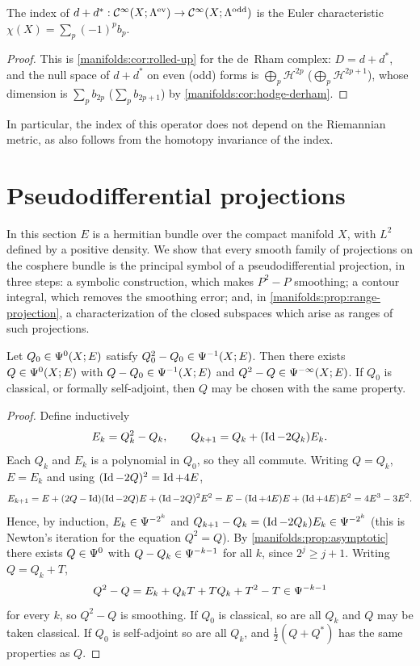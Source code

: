 \begin{corollary}\label{manifolds:cor:euler}
The index of $d+d^*:\mathcal{C}^\infty(X;\Lambda^{\mathrm{ev}})\to\mathcal{C}^\infty(X;\Lambda^{\mathrm{odd}})$ is the Euler
characteristic $\chi(X)=\sum_p(-1)^pb_p$.
\end{corollary}
\begin{proof}
This is \cref{manifolds:cor:rolled-up} for the de~Rham complex: $D=d+d^*$, and the
null space of $d+d^*$ on even (odd) forms is $\bigoplus_p\mathcal H^{2p}$
($\bigoplus_p\mathcal H^{2p+1}$), whose dimension is $\sum_pb_{2p}$ ($\sum_pb_{2p+1}$) by
\cref{manifolds:cor:hodge-derham}.
\end{proof}

In particular, the index of this operator does not depend on the Riemannian metric,
as also follows from the homotopy invariance of the index.

\section{Pseudodifferential projections}\label{manifolds:sec:projections}
In this section $E$ is a hermitian bundle over the compact manifold $X$, with $L^2$
defined by a positive density. We show that every smooth family of projections on
the cosphere bundle is the principal symbol of a pseudodifferential projection, in
three steps: a symbolic construction, which makes $P^2-P$ smoothing; a contour
integral, which removes the smoothing error; and, in
\cref{manifolds:prop:range-projection}, a characterization of the closed subspaces
which arise as ranges of such projections.

\begin{lemma}\label{manifolds:lem:newton}
Let $Q_0\in\Psi^{0}(X;E)$ satisfy $Q_0^2-Q_0\in\Psi^{-1}(X;E)$. Then there exists
$Q\in\Psi^{0}(X;E)$ with $Q-Q_0\in\Psi^{-1}(X;E)$ and $Q^2-Q\in\Psi^{-\infty}(X;E)$. If $Q_0$
is classical, or formally self-adjoint, then $Q$ may be chosen with the same property.
\end{lemma}
\begin{proof}
Define inductively
\begin{equation*}
E_k=Q_k^2-Q_k,\qquad Q_{k+1}=Q_k+(\operatorname{Id}-2Q_k)E_k .
\end{equation*}
Each $Q_k$ and $E_k$ is a polynomial in $Q_0$, so they all commute. Writing $Q=Q_k$,
$E=E_k$ and using $(\operatorname{Id}-2Q)^2=\operatorname{Id}+4E$,
\begin{equation*}
E_{k+1}=E+(2Q-\operatorname{Id})(\operatorname{Id}-2Q)E+(\operatorname{Id}-2Q)^2E^2=E-(\operatorname{Id}+4E)E+(\operatorname{Id}+4E)E^2=4E^3-3E^2 .
\end{equation*}
Hence, by induction, $E_k\in\Psi^{-2^k}$ and $Q_{k+1}-Q_k=(\operatorname{Id}-2Q_k)E_k\in\Psi^{-2^k}$
(this is Newton's iteration for the equation $Q^2=Q$). By
\cref{manifolds:prop:asymptotic} there exists $Q\in\Psi^{0}$ with
$Q-Q_k\in\Psi^{-k-1}$ for all $k$, since $2^j\ge j+1$. Writing $Q=Q_k+T$,
\begin{equation*}
Q^2-Q=E_k+Q_kT+TQ_k+T^2-T\in\Psi^{-k-1}
\end{equation*}
for every $k$, so $Q^2-Q$ is smoothing. If $Q_0$ is classical, so are all $Q_k$ and
$Q$ may be taken classical. If $Q_0$ is self-adjoint so are all $Q_k$, and
$\frac12(Q+Q^*)$ has the same properties as $Q$.
\end{proof}

